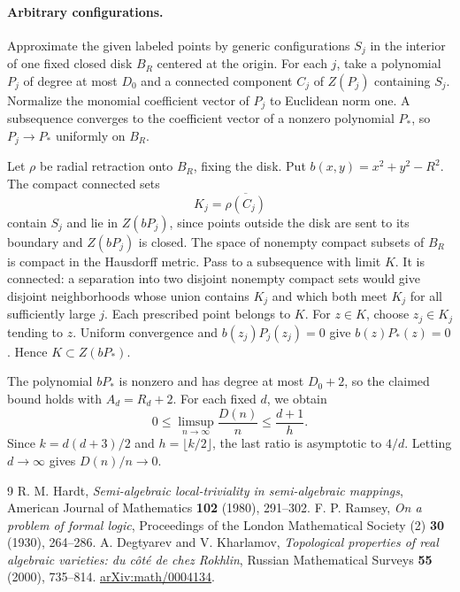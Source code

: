\documentclass[11pt,letterpaper]{article}
\begin{document}
\paragraph{Arbitrary configurations.}
Approximate the given labeled points by generic configurations $S_j$ in the interior of one fixed closed disk $B_R$ centered at the origin. For each $j$, take a polynomial $P_j$ of degree at most $D_0$ and a connected component $C_j$ of $Z(P_j)$ containing $S_j$. Normalize the monomial coefficient vector of $P_j$ to Euclidean norm one. A subsequence converges to the coefficient vector of a nonzero polynomial $P_*$, so $P_j\to P_*$ uniformly on $B_R$.

Let $\rho$ be radial retraction onto $B_R$, fixing the disk. Put $b(x,y)=x^2+y^2-R^2$. The compact connected sets
\[
K_j=\overline{\rho(C_j)}
\]
contain $S_j$ and lie in $Z(bP_j)$, since points outside the disk are sent to its boundary and $Z(bP_j)$ is closed. The space of nonempty compact subsets of $B_R$ is compact in the Hausdorff metric. Pass to a subsequence with limit $K$. It is connected: a separation into two disjoint nonempty compact sets would give disjoint neighborhoods whose union contains $K_j$ and which both meet $K_j$ for all sufficiently large $j$. Each prescribed point belongs to $K$. For $z\in K$, choose $z_j\in K_j$ tending to $z$. Uniform convergence and $b(z_j)P_j(z_j)=0$ give $b(z)P_*(z)=0$. Hence $K\subset Z(bP_*)$.

The polynomial $bP_*$ is nonzero and has degree at most $D_0+2$, so the claimed bound holds with $A_d=R_d+2$. For each fixed $d$, we obtain
\[
0\leq\limsup_{n\to\infty}\frac{D(n)}n\leq\frac{d+1}{h}.
\]
Since $k=d(d+3)/2$ and $h=\lfloor k/2\rfloor$, the last ratio is asymptotic to $4/d$. Letting $d\to\infty$ gives $D(n)/n\to0$.

\begin{thebibliography}{9}
 R. M. Hardt, \emph{Semi-algebraic local-triviality in semi-algebraic mappings}, American Journal of Mathematics \textbf{102} (1980), 291--302.
 F. P. Ramsey, \emph{On a problem of formal logic}, Proceedings of the London Mathematical Society (2) \textbf{30} (1930), 264--286.
 A. Degtyarev and V. Kharlamov, \emph{Topological properties of real algebraic varieties: du c\^ot\'e de chez Rokhlin}, Russian Mathematical Surveys \textbf{55} (2000), 735--814. \href{https://arxiv.org/abs/math/0004134}{arXiv:math/0004134}.
\end{thebibliography}

\clearpage
\end{document}
